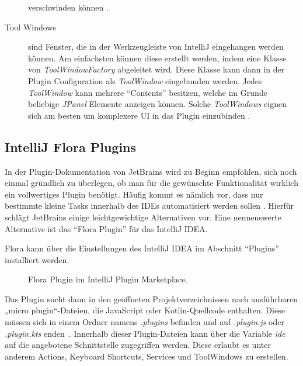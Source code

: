 \begin{description}
      verschwinden können \cite{IntelliJPlatformSDKNotifications}.
    \item[Tool Windows] sind Fenster, die in der Werkzeugleiste von IntelliJ eingehangen
      werden können. Am einfachsten können diese erstellt werden, indem eine Klasse
      von \emph{ToolWindowFactory} abgeleitet wird. Diese Klasse kann dann 
      in der Plugin Configuration als \emph{ToolWindow} eingebunden werden. Jedes \emph{ToolWindow}
      kann mehrere \enquote{Contents} besitzen, welche im Grunde beliebige \emph{JPanel} 
      Elemente anzeigen können. Solche \emph{ToolWindows} eignen sich am besten um komplexere
      UI in das Plugin einzubinden \cite{IntelliJPlatformSDKToolWindows}.
  \end{description}

\subsection{IntelliJ Flora Plugins}

In der Plugin-Dokumentation von JetBrains wird zu Beginn 
empfohlen, sich noch einmal gründlich zu überlegen, ob man 
für die gewünschte Funktionalität wirklich ein 
vollwertiges Plugin benötigt. Häufig kommt es nämlich vor, 
dass nur bestimmte kleine Tasks innerhalb des IDEs 
automatisiert werden sollen \cite{IntelliJSDKDocumentation}. Hierfür schlägt JetBrains 
einige leichtgewichtige Alternativen vor. Eine nennenswerte 
Alternative ist das \enquote{Flora Plugin} für das IntelliJ IDEA. 

Flora kann über die Einstellungen des IntelliJ IDEA 
im Abschnitt \enquote{Plugins} installiert werden.

\begin{figure}
    \centering
    \caption{Flora Plugin im IntelliJ Plugin Marketplace.}
    \label{fig:FloraPlugin}
\end{figure}    
 
Das Plugin sucht dann in den geöffneten Projektverzeichnissen nach ausführbaren 
„micro plugin“-Dateien, die JavaScript oder Kotlin-Quellcode enthalten. 
Diese müssen sich in einem Ordner namens \emph{.plugins} 
befinden und auf \emph{.plugin.js} oder \emph{.plugin.kts} enden~\cite{FloraPluginMarketplace}.
Innerhalb dieser Plugin-Dateien kann über die Variable \emph{ide} auf 
die angebotene Schnittstelle zugegriffen werden. Diese erlaubt 
es unter anderem Actions, Keyboard Shortcuts, Services und 
ToolWindows zu erstellen.

